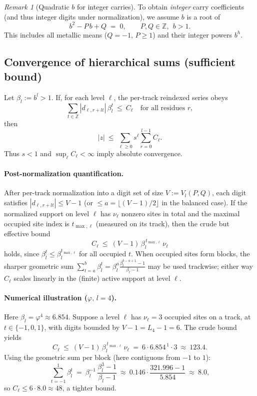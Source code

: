 \documentclass[11pt]{article}
\theoremstyle{definition}
\theoremstyle{remark}
\newtheorem{remark}[theorem]{Remark}
\newcommand{\Z}{\mathbb{Z}}
\begin{document}
\begin{remark}[Quadratic $b$ for integer carries]\label{rem:quad}
To obtain \emph{integer} carry coefficients (and thus integer digits under normalization), we assume $b$ is a root of
\begin{equation}\label{eq:quad}
b^2 - P\,b + Q \;=\; 0,\qquad P,Q\in\Z,\ \ b>1.
\end{equation}
This includes all metallic means ($Q=-1$, $P\ge1$) and their integer powers $b^h$.
\end{remark}

\subsection*{Convergence of hierarchical sums (sufficient bound)}
Let $\beta_l:=b^l>1$. If, for each level $\ell$, the per-track reindexed series obeys
\[
\sum_{t\in\Z}\! |d_{\ell,r+lt}|\,\beta_l^{t}\ \le\ C_\ell\quad\text{for all residues }r,
\]
then
\[
|z|\ \le\ \sum_{\ell\ge0} s^\ell \sum_{r=0}^{l-1} C_\ell.
\]
Thus $s<1$ and $\sup_\ell C_\ell<\infty$ imply absolute convergence.

\paragraph{Post-normalization quantification.}
After per-track normalization into a digit set of size $V:=V_l(P,Q)$, each digit satisfies $|d_{\ell,r+lt}|\le V-1$ (or $\le a=\lfloor(V-1)/2\rfloor$ in the balanced case). If the normalized support on level $\ell$ has $\nu_\ell$ nonzero sites in total and the maximal occupied site index is $t_{\max,\ell}$ (measured on its track), then the crude but effective bound
\[
\boxed{\ C_\ell\ \le\ (V-1)\,\beta_l^{\,t_{\max,\ell}}\,\nu_\ell\ }
\]
holds, since $\beta_l^{t}\le \beta_l^{t_{\max,\ell}}$ for all occupied $t$. When occupied sites form blocks, the sharper geometric sum
$\sum_{t=a}^{b}\beta_l^t=\beta_l^{a}\frac{\beta_l^{b-a+1}-1}{\beta_l-1}$
may be used trackwise; either way $C_\ell$ scales linearly in the (finite) active support at level $\ell$.

\paragraph{Numerical illustration ($\varphi,\,l=4$).}
Here $\beta_l=\varphi^4\approx 6.854$. Suppose a level $\ell$ has $\nu_\ell=3$ occupied sites on a track, at $t\in\{-1,0,1\}$, with digits bounded by $V-1=L_4-1=6$. The crude bound yields
\[
C_\ell \ \le\ (V-1)\,\beta_l^{\,t_{\max,\ell}}\,\nu_\ell \ =\ 6\cdot 6.854^{\,1}\cdot 3\ \approx\ 123.4.
\]
Using the geometric sum per block (here contiguous from $-1$ to $1$):
\[
\sum_{t=-1}^{1} \beta_l^{t} \ =\ \beta_l^{-1}\,\frac{\beta_l^{3}-1}{\beta_l-1}
\ \approx\ 0.146\cdot \frac{321.996-1}{5.854} \ \approx\ 8.0,
\]
so $C_\ell\le 6\cdot 8.0\approx 48$, a tighter bound.
\end{document}

